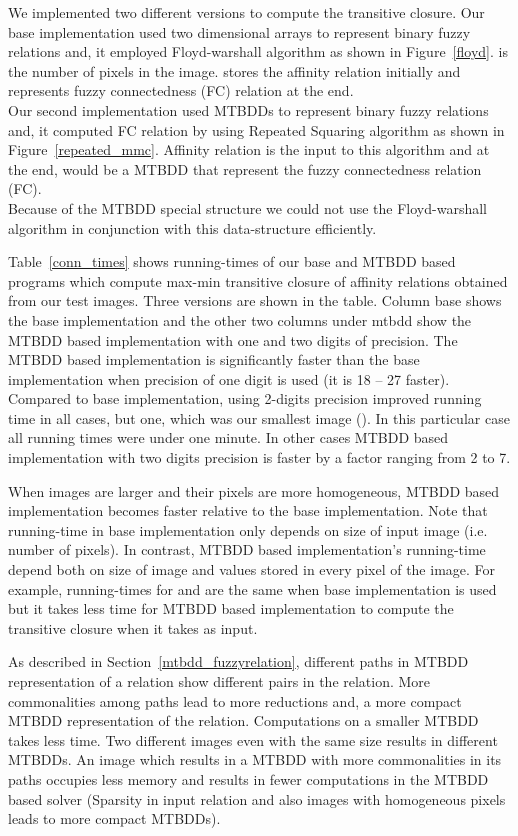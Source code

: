 \documentclass[4pt]{article}
\begin{document}
We implemented two different versions to compute the transitive closure. Our base implementation used two dimensional arrays to represent binary fuzzy relations and, it employed Floyd-warshall algorithm as shown in Figure~\ref{floyd}.  is the number of pixels in the image.  stores the affinity relation initially and represents fuzzy connectedness (FC) relation at the end.\\
Our second implementation used MTBDDs to represent binary fuzzy relations and, it computed FC relation by using Repeated Squaring algorithm as shown in Figure~\ref{repeated_mmc}. Affinity relation is the input to this algorithm and at the end,  would be a MTBDD that represent the fuzzy connectedness relation (FC).\\
Because of the MTBDD special structure we could not use the Floyd-warshall algorithm in conjunction with this data-structure efficiently.

Table~\ref{conn_times} shows running-times of our base and MTBDD based programs which compute max-min transitive closure of affinity relations obtained from our test images. Three versions are shown in the table. Column base shows the base implementation and the other two columns under mtbdd show the MTBDD based implementation with one and two digits of precision. The MTBDD based implementation is significantly faster than the base implementation when precision of one digit is used (it is 18 -- 27 faster). Compared to base implementation, using 2-digits precision improved running time in all cases, but one, which was our smallest image (). In this particular case all running times were under one minute. In other cases MTBDD based implementation with two digits precision is faster by a factor ranging from 2 to 7. 

When images are larger and their pixels are more homogeneous, MTBDD based implementation becomes faster relative to the base implementation. Note that running-time in base implementation only depends on size of input image (i.e. number of pixels). In contrast, MTBDD based implementation's running-time depend both on size of image and values stored in every pixel of the image. For example, running-times for  and  are the same when base implementation is used but it takes less time for MTBDD based implementation to compute the transitive closure when it takes  as input. 

As described in Section~\ref{mtbdd_fuzzyrelation}, different paths in MTBDD representation of a relation show different pairs in the relation. More commonalities among paths lead to more reductions and, a more compact MTBDD representation of the relation. Computations on a smaller MTBDD takes less time. Two different images even with the same size results in different MTBDDs. An image which results in a MTBDD with more commonalities in its paths occupies less memory and results in fewer computations in the MTBDD based solver (Sparsity in input relation and also images with homogeneous pixels leads to more compact MTBDDs).
\end{document}
